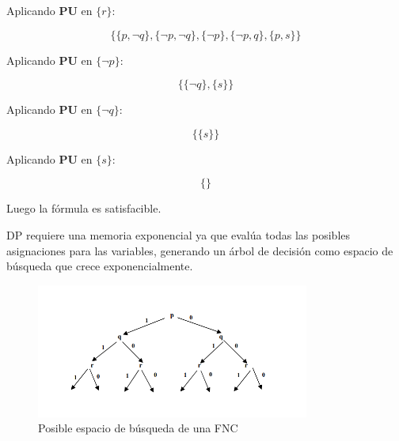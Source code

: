 Aplicando \textbf{PU} en $\{r\}$:

\begin{equation*}
\{\{p,\neg q\},\{\neg p,\neg q\},\{\neg p\},\{\neg p,q\},\{p,s\}\}
\end{equation*}

Aplicando \textbf{PU} en $\{\neg p\}$:

\begin{equation*}
\{\{\neg q\},\{s\}\}
\end{equation*}

Aplicando \textbf{PU} en $\{\neg q\}$:

\begin{equation*}
\{\{s\}\}
\end{equation*}

Aplicando \textbf{PU} en $\{s\}$:

\begin{equation*}
\{\}
\end{equation*}

Luego la fórmula es satisfacible.

DP requiere una memoria exponencial ya que evalúa todas las posibles asignaciones para las variables, generando un árbol de decisión como espacio de búsqueda que crece exponencialmente.

\begin{figure}[ht]
    \centering
    \includegraphics[width=0.8\textwidth]{Graphics/arboldp.png}
    \caption{Posible espacio de búsqueda de una FNC}
    \label{fig:arbol DP}
\end{figure}

